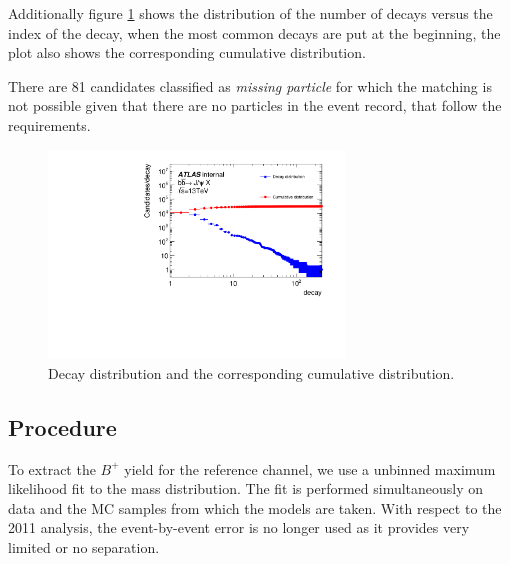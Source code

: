 Additionally figure \ref{fig:decay_distribution} shows the distribution of the number of decays
versus the index of the decay, when the most common decays are put at the beginning, the plot
also shows the corresponding cumulative distribution.

There are 81 candidates classified as \textit{missing particle} for which the matching is not possible
given that there are no particles in the event record, that follow the requirements. 

\begin{figure}
    \centering
    \includegraphics[width=0.70\textwidth]{decay_frequency.pdf}
    \caption{Decay distribution and the corresponding cumulative distribution.}
    \label{fig:decay_distribution}
\end{figure}

\subsection{Procedure}
To extract the $B^+$ yield for the reference channel, we use a
unbinned maximum likelihood fit to the mass distribution.
The fit is performed simultaneously on data and the MC samples
from which the models are taken.
With respect to the 2011 analysis, the event-by-event error is
no longer used as it provides very limited or no separation.

